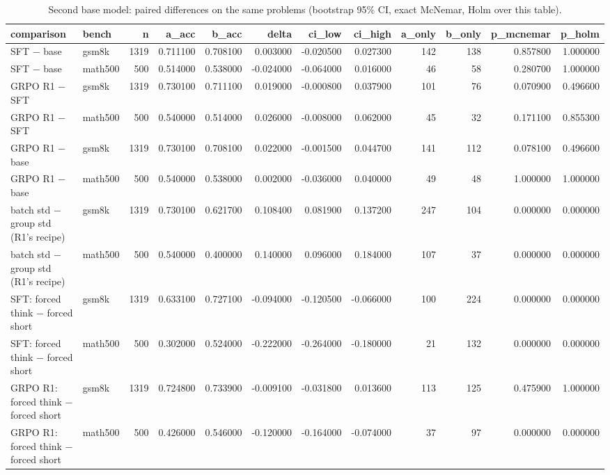 \begin{table}
\caption{Second base model: paired differences on the same problems (bootstrap 95\% CI, exact McNemar, Holm over this table).}
\label{tab:second_model_paired}
\begin{tabular}{llrrrrrrrrrr}
\toprule
comparison & bench & n & a_acc & b_acc & delta & ci_low & ci_high & a_only & b_only & p_mcnemar & p_holm \\
\midrule
SFT − base & gsm8k & 1319 & 0.711100 & 0.708100 & 0.003000 & -0.020500 & 0.027300 & 142 & 138 & 0.857800 & 1.000000 \\
SFT − base & math500 & 500 & 0.514000 & 0.538000 & -0.024000 & -0.064000 & 0.016000 & 46 & 58 & 0.280700 & 1.000000 \\
GRPO R1 − SFT & gsm8k & 1319 & 0.730100 & 0.711100 & 0.019000 & -0.000800 & 0.037900 & 101 & 76 & 0.070900 & 0.496600 \\
GRPO R1 − SFT & math500 & 500 & 0.540000 & 0.514000 & 0.026000 & -0.008000 & 0.062000 & 45 & 32 & 0.171100 & 0.855300 \\
GRPO R1 − base & gsm8k & 1319 & 0.730100 & 0.708100 & 0.022000 & -0.001500 & 0.044700 & 141 & 112 & 0.078100 & 0.496600 \\
GRPO R1 − base & math500 & 500 & 0.540000 & 0.538000 & 0.002000 & -0.036000 & 0.040000 & 49 & 48 & 1.000000 & 1.000000 \\
batch std − group std (R1's recipe) & gsm8k & 1319 & 0.730100 & 0.621700 & 0.108400 & 0.081900 & 0.137200 & 247 & 104 & 0.000000 & 0.000000 \\
batch std − group std (R1's recipe) & math500 & 500 & 0.540000 & 0.400000 & 0.140000 & 0.096000 & 0.184000 & 107 & 37 & 0.000000 & 0.000000 \\
SFT: forced think − forced short & gsm8k & 1319 & 0.633100 & 0.727100 & -0.094000 & -0.120500 & -0.066000 & 100 & 224 & 0.000000 & 0.000000 \\
SFT: forced think − forced short & math500 & 500 & 0.302000 & 0.524000 & -0.222000 & -0.264000 & -0.180000 & 21 & 132 & 0.000000 & 0.000000 \\
GRPO R1: forced think − forced short & gsm8k & 1319 & 0.724800 & 0.733900 & -0.009100 & -0.031800 & 0.013600 & 113 & 125 & 0.475900 & 1.000000 \\
GRPO R1: forced think − forced short & math500 & 500 & 0.426000 & 0.546000 & -0.120000 & -0.164000 & -0.074000 & 37 & 97 & 0.000000 & 0.000000 \\
\bottomrule
\end{tabular}
\end{table}
